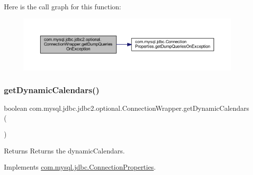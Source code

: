 Here is the call graph for this function\+:
\nopagebreak
\begin{figure}[H]
\begin{center}
\leavevmode
\includegraphics[width=350pt]{classcom_1_1mysql_1_1jdbc_1_1jdbc2_1_1optional_1_1_connection_wrapper_a21a6730d44ced20d8242a8adaae34364_cgraph}
\end{center}
\end{figure}
\mbox{\label{classcom_1_1mysql_1_1jdbc_1_1jdbc2_1_1optional_1_1_connection_wrapper_a0b2ae292dd1bf086fa44c57a0cc34264}} 
\subsubsection{\texorpdfstring{get\+Dynamic\+Calendars()}{getDynamicCalendars()}}
{\footnotesize\ttfamily boolean com.\+mysql.\+jdbc.\+jdbc2.\+optional.\+Connection\+Wrapper.\+get\+Dynamic\+Calendars (\begin{DoxyParamCaption}{ }\end{DoxyParamCaption})}

\begin{DoxyReturn}{Returns}
Returns the dynamic\+Calendars. 
\end{DoxyReturn}


Implements \mbox{\hyperlink{interfacecom_1_1mysql_1_1jdbc_1_1_connection_properties_aa8a465589df5cfff61d5903b1cb6fb85}{com.\+mysql.\+jdbc.\+Connection\+Properties}}.

